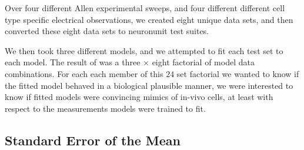 Over four different Allen experimental sweeps, and four different different cell type specific electrical observations, we created eight unique data sets, and then converted these eight data sets to neuronunit test suites.

We then took three different models, and we attempted to fit each test set to each model. The result of was a three $\times $ eight factorial of model data combinations. For each each member of this $24$ set factorial we wanted to know if the fitted model behaved in a biological plausible manner, we were interested to know if fitted models were convincing mimics of in-vivo cells, at least with respect to the measurements models were trained to fit.

\subsection{Standard Error of the Mean}
\begin{table}
\caption[Standard Error of the mean across NeuroElectro Data Sources]{A table of SEM values that describe dispersal in all of the different measurements I used to fit the optimized models to.}
\end{table}

